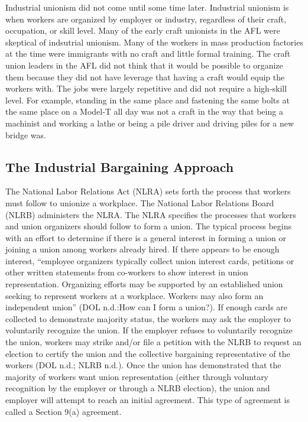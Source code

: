 Industrial unionism did not come until some time later. Industrial unionism is when workers are organized by employer or industry, regardless of their craft, occupation, or skill level. Many of the early craft unionists in the AFL were skeptical of indsutrial unionism. Many of the workers in mass production factories at the time were immigrants with no craft and little formal training. The craft union leaders in the AFL did not think that it would be possible to organize them because they did not have leverage that having a craft would equip the workers with. The jobs were largely repetitive and did not require a high-skill level. For example, standing in the same place and fastening the same bolts at the same place on a Model-T all day was not a craft in the way that being a machinist and working a lathe or being a pile driver and driving piles for a new bridge was.

\subsection{The Industrial Bargaining Approach}

The National Labor Relations Act (NLRA) sets forth the process that workers must follow to unionize a workplace. The National Labor Relations Board (NLRB) administers the NLRA. The NLRA specifies the processes that workers and union organizers should follow to form a union. The typical process begins with an effort to determine if there is a general interest in forming a union or joining a union among workers already hired. If there appears to be enough interest, “employee organizers typically collect union interest cards, petitions or other written statements from co-workers to show interest in union representation. Organizing efforts may be supported by an established union seeking to represent workers at a workplace. Workers may also form an independent union” (DOL n.d.:How can I form a union?). If enough cards are collected to demonstrate majority status, the workers may ask the employer to voluntarily recognize the union. If the employer refuses to voluntarily recognize the union, workers may strike and/or file a petition with the NLRB to request an election to certify the union and the collective bargaining representative of the workers (DOL n.d.; NLRB n.d.). Once the union has demonstrated that the majority of workers want union representation (either through voluntary recognition by the employer or through a NLRB election), the union and employer will attempt to reach an initial agreement. This type of agreement is called a Section 9(a) agreement.

